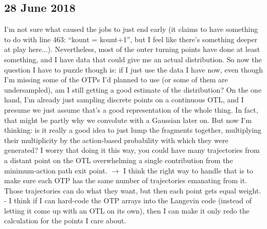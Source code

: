 \subsection*{28 June 2018}
I'm not sure what caused the jobs to just end early (it claims to have something to do with line 463: ``kount = kount+1'', but I feel like there's something deeper at play here...). Nevertheless, most of the outer turning points have done at least something, and I have data that could give me an actual distribution. So now the question I have to puzzle though is: if I just use the data I have now, even though I'm missing some of the OTPs I'd planned to use (or some of them are undersampled), am I still getting a good estimate of the distribution? On the one hand, I'm already just sampling discrete points on a continuous OTL, and I presume we just assume that's a good representation of the whole thing. In fact, that might be partly why we convolute with a Gaussian later on. But now I'm thinking: is it really a good idea to just lump the fragments together, multiplying their multiplicity by the action-based probability with which they were generated? I worry that doing it this way, you could have many trajectories from a distant point on the OTL overwhelming a single contribution from the minimum-action path exit point. $\rightarrow$ I think the right way to handle that is to make sure each OTP has the same number of trajectories emanating from it. Those trajectories can do what they want, but then each point gets equal weight. - I think if I can hard-code the OTP arrays into the Langevin code (instead of letting it come up with an OTL on its own), then I can make it only redo the calculation for the points I care about.